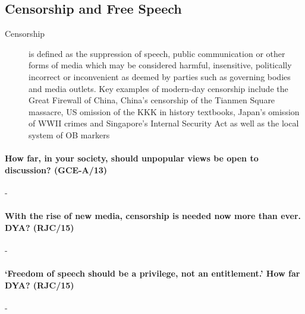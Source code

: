 \documentclass[../../main]{subfiles}
\begin{document}
\subsection{Censorship and Free Speech}

\begin{description}
	\item[Censorship] is defined as the suppression of speech, public communication or other forms of media which may be considered harmful, insensitive, politically incorrect or inconvenient as deemed by parties such as governing bodies and media outlets. Key examples of modern-day censorship include the Great Firewall of China, China's censorship of the Tianmen Square massacre, US omission of the KKK in history textbooks, Japan's omission of WWII crimes and Singapore's Internal Security Act as well as the local system of OB markers
\end{description}

\paragraph{How far, in your society, should unpopular views be open to discussion? (GCE-A/13)}-

\paragraph{With the rise of new media, censorship is needed now more than ever. DYA? (RJC/15)}-

\paragraph{`Freedom of speech should be a privilege, not an entitlement.' How far DYA? (RJC/15)}-
\end{document}
